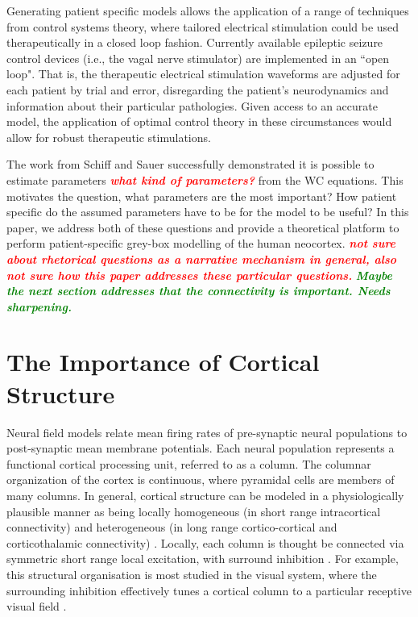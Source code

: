 \documentclass[12pt]{iopart}
\newcommand{\wtf}[1]{\textsf{\emph{\textbf{\textcolor{red}{#1}}}}}
\newcommand{\omg}[1]{\textsf{\emph{\textbf{\textcolor{green}{#1}}}}}
\begin{document}
Generating patient specific models allows the application of a range of techniques from control systems theory, where tailored electrical stimulation could be used therapeutically in a closed loop fashion. Currently available epileptic seizure  control devices (i.e., the vagal nerve stimulator) are implemented in an ``open loop". That is, the therapeutic electrical stimulation waveforms are adjusted for each patient by trial and error, disregarding the patient's neurodynamics and information about their particular pathologies. Given access to an accurate model, the application of optimal control theory in these circumstances would allow for robust therapeutic stimulations.

The work from Schiff and Sauer \cite{schiff2008kalman} successfully demonstrated it is possible to estimate parameters \wtf{what kind of parameters?} from the WC equations. This motivates the question, what parameters are the most important? How patient specific do the assumed parameters have to be for the model to be useful? In this paper, we address both of these questions and provide a theoretical platform to perform patient-specific grey-box modelling of the human neocortex. \wtf{not sure about rhetorical questions as a narrative mechanism in general, also not sure how this paper addresses these particular questions.} \omg{Maybe the next section addresses that the connectivity is important. Needs sharpening.}

\section{The Importance of Cortical Structure} Neural field models relate mean firing rates of pre-synaptic neural populations to post-synaptic mean membrane potentials. Each neural population represents a functional cortical processing unit, referred to as a column. The columnar organization of the cortex is continuous, where pyramidal cells are members of many columns. In general, cortical structure can be modeled in a physiologically plausible manner as being locally homogeneous (in short range intracortical connectivity) and heterogeneous (in long range cortico-cortical and corticothalamic connectivity) \cite{Jirsa2009} \cite{Qubbaj2007}. Locally, each column is thought be connected via symmetric short range local excitation, with surround inhibition \cite{Braitenberg1998}. For example, this structural organisation is most studied in the visual system, where the surrounding inhibition effectively tunes a cortical column to a particular receptive visual field \cite{Sullivan2006}.
\end{document}
